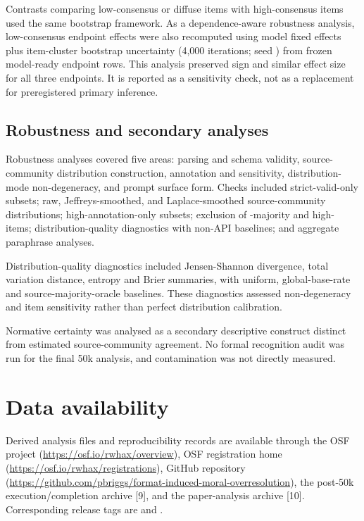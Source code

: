 \documentclass[11pt]{article}
\begin{document}
Contrasts comparing low-consensus or diffuse items with high-consensus items used the same bootstrap framework. As a dependence-aware robustness analysis, low-consensus endpoint effects were also recomputed using model fixed effects plus item-cluster bootstrap uncertainty (4,000 iterations; seed ) from frozen model-ready endpoint rows. This analysis preserved sign and similar effect size for all three endpoints. It is reported as a sensitivity check, not as a replacement for preregistered primary inference.

\subsection{Robustness and secondary analyses}

Robustness analyses covered five areas: parsing and schema validity, source-community distribution construction, annotation and  sensitivity, distribution-mode non-degeneracy, and prompt surface form. Checks included strict-valid-only subsets; raw, Jeffreys-smoothed, and Laplace-smoothed source-community distributions; high-annotation-only subsets; exclusion of -majority and high- items; distribution-quality diagnostics with non-API baselines; and aggregate paraphrase analyses.

Distribution-quality diagnostics included Jensen-Shannon divergence, total variation distance, entropy and Brier summaries, with uniform, global-base-rate and source-majority-oracle baselines. These diagnostics assessed non-degeneracy and item sensitivity rather than perfect distribution calibration.

Normative certainty was analysed as a secondary descriptive construct distinct from estimated source-community agreement. No formal recognition audit was run for the final 50k analysis, and contamination was not directly measured.

\section{Data availability}

Derived analysis files and reproducibility records are available through the OSF project (\url{https://osf.io/rwhax/overview}), OSF registration home (\url{https://osf.io/rwhax/registrations}), GitHub repository (\url{https://github.com/pbriggs/format-induced-moral-overresolution}), the post-50k execution/completion archive [9], and the paper-analysis archive [10]. Corresponding release tags are  and .
\end{document}

